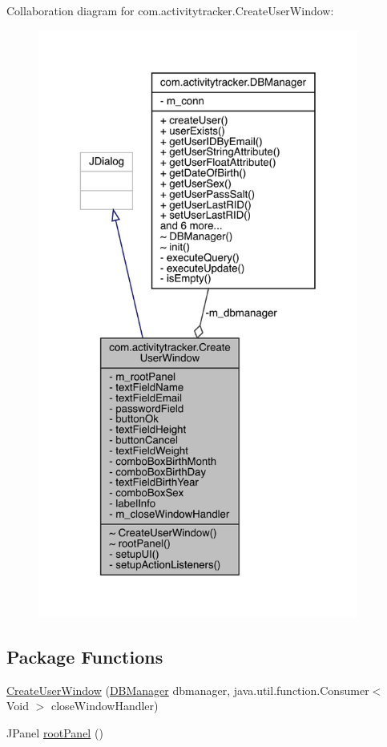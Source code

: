 Collaboration diagram for com.\+activitytracker.\+Create\+User\+Window\+:
\nopagebreak
\begin{figure}[H]
\begin{center}
\leavevmode
\includegraphics[height=550pt]{classcom_1_1activitytracker_1_1_create_user_window__coll__graph}
\end{center}
\end{figure}
\subsection*{Package Functions}
\begin{DoxyCompactItemize}
\item 
\mbox{\hyperlink{classcom_1_1activitytracker_1_1_create_user_window_ae7ace1ff93272b1f0ec6843856fa4222}{Create\+User\+Window}} (\mbox{\hyperlink{classcom_1_1activitytracker_1_1_d_b_manager}{D\+B\+Manager}} dbmanager, java.\+util.\+function.\+Consumer$<$ Void $>$ close\+Window\+Handler)
\item 
J\+Panel \mbox{\hyperlink{classcom_1_1activitytracker_1_1_create_user_window_a862f018ae96eb5df7529ff1beb312ff1}{root\+Panel}} ()
\end{DoxyCompactItemize}
